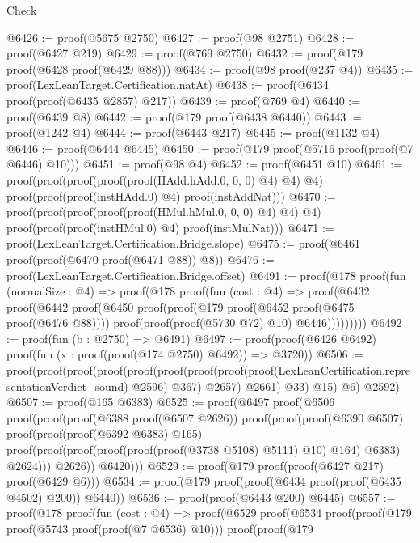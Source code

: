 \begin{lexlean}{Check}
\begin{coremodule}
@6426 := proof(@5675 @2750)
@6427 := proof(@98 @2751)
@6428 := proof(@6427 @219)
@6429 := proof(@769 @2750)
@6432 := proof(@179 proof(@6428 proof(@6429 @88)))
@6434 := proof(@98 proof(@237 @4))
@6435 := proof(LexLeanTarget.Certification.natAt)
@6438 := proof(@6434 proof(proof(@6435 @2857) @217))
@6439 := proof(@769 @4)
@6440 := proof(@6439 @8)
@6442 := proof(@179 proof(@6438 @6440))
@6443 := proof(@1242 @4)
@6444 := proof(@6443 @217)
@6445 := proof(@1132 @4)
@6446 := proof(@6444 @6445)
@6450 := proof(@179 proof(@5716 proof(proof(@7 @6446) @10)))
@6451 := proof(@98 @4)
@6452 := proof(@6451 @10)
@6461 := proof(proof(proof(proof(proof(HAdd.hAdd.{0, 0, 0}) @4) @4) @4)
      proof(proof(proof(instHAdd.{0}) @4) proof(instAddNat)))
@6470 := proof(proof(proof(proof(proof(HMul.hMul.{0, 0, 0}) @4) @4) @4)
      proof(proof(proof(instHMul.{0}) @4) proof(instMulNat)))
@6471 := proof(LexLeanTarget.Certification.Bridge.slope)
@6475 := proof(@6461 proof(proof(@6470 proof(@6471 @88)) @8))
@6476 := proof(LexLeanTarget.Certification.Bridge.offset)
@6491 := proof(@178
      proof(fun (normalSize : @4) =>
        proof(@178
            proof(fun (cost : @4) =>
              proof(@6432
                  proof(@6442
                      proof(@6450
                          proof(proof(@179 proof(@6452 proof(@6475 proof(@6476 @88))))
                              proof(proof(proof(@5730 @72) @10) @6446)))))))))
@6492 := proof(fun (b : @2750) => @6491)
@6497 := proof(proof(@6426 @6492) proof(fun (x : proof(proof(@174 @2750) @6492)) => @3720))
@6506 := proof(proof(proof(proof(proof(proof(proof(proof(proof(LexLeanCertification.representationVerdict_sound)
                    @2596)
                  @367)
                @2657)
              @2661)
            @33)
          @15)
        @6)
      @2592)
@6507 := proof(@165 @6383)
@6525 := proof(@6497
      proof(@6506
          proof(proof(proof(@6388 proof(@6507 @2626))
                proof(proof(proof(@6390 @6507)
                      proof(proof(proof(@6392 @6383) @165)
                          proof(proof(proof(proof(proof(proof(@3738 @5108) @5111) @10) @164) @6383)
                              @2624)))
                    @2626))
              @6420)))
@6529 := proof(@179 proof(proof(@6427 @217) proof(@6429 @6)))
@6534 := proof(@179 proof(proof(@6434 proof(proof(@6435 @4502) @200)) @6440))
@6536 := proof(proof(@6443 @200) @6445)
@6557 := proof(@178
      proof(fun (cost : @4) =>
        proof(@6529
            proof(@6534
                proof(proof(@179 proof(@5743 proof(proof(@7 @6536) @10)))
                    proof(proof(@179

\end{coremodule}
\end{lexlean}
